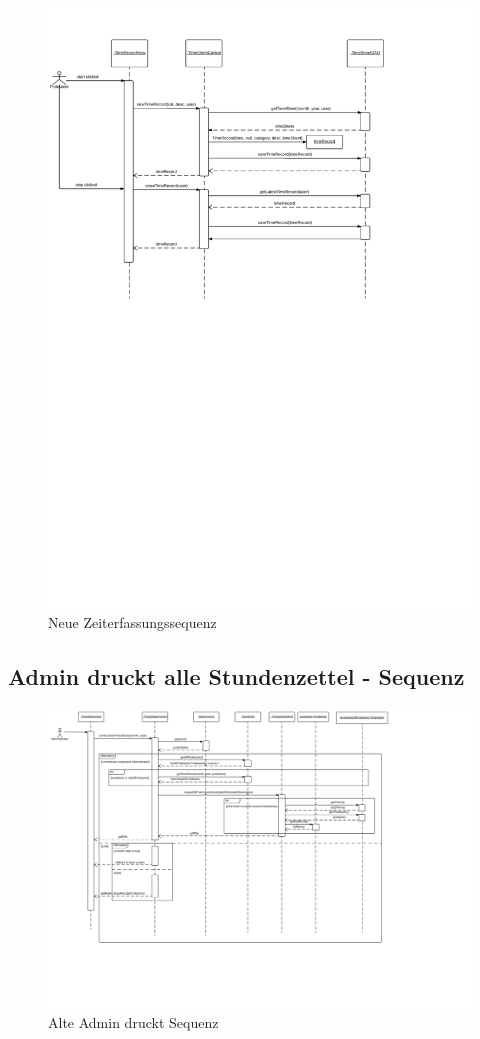     \begin{figure}
      \centering
        \includegraphics[width=\linewidth]{new-Time-record-new.pdf}
       \caption{Neue Zeiterfassungssequenz}
    \end{figure}

\subsection{Admin druckt alle Stundenzettel - Sequenz}
    \begin{figure}
      \centering
        \includegraphics[width=\linewidth]{Admin-prints-all-timesheets.pdf}
       \caption{Alte Admin druckt Sequenz}
    \end{figure}

